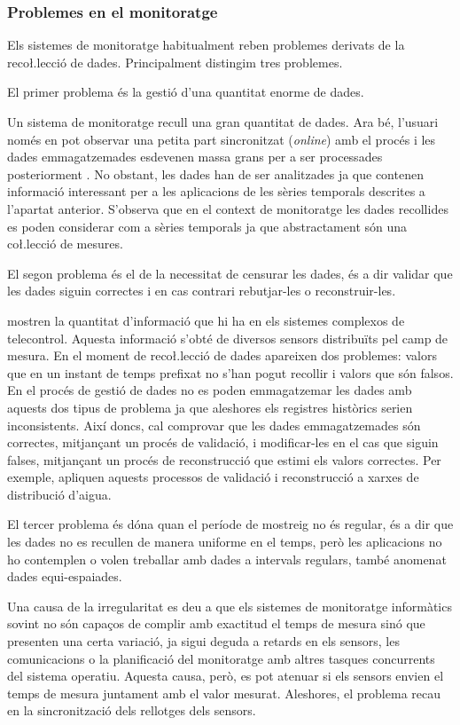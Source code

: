 \subsubsection{Problemes en el monitoratge}

Els sistemes de monitoratge habitualment reben problemes derivats de la reco\l.lecció de dades. Principalment distingim tres problemes.

El primer problema és la gestió d'una quantitat enorme de dades. 

Un sistema de monitoratge recull una gran quantitat de dades. Ara bé, l'usuari només en pot observar una petita part sincronitzat (\emph{online}) amb el procés i les dades emmagatzemades esdevenen massa grans per a ser processades posteriorment \parencite{keogh97}. No obstant, les dades han de ser analitzades ja que contenen informació interessant per a les aplicacions de les sèries temporals descrites a l'apartat anterior. S'observa que en el context de monitoratge les dades recollides es poden considerar com a sèries temporals ja que abstractament són una co\l.lecció de mesures.


El segon problema és el de la necessitat de censurar les dades, és a dir validar que les dades siguin correctes i en cas contrari rebutjar-les o reconstruir-les. 

\textcite{quevedo10} mostren la quantitat d'informació que hi ha en els sistemes complexos de telecontrol. Aquesta informació s'obté de diversos sensors distribuïts pel camp de mesura.
En el moment de reco\l.lecció de dades apareixen dos problemes: valors que en un instant de temps prefixat no s'han pogut recollir i valors que són falsos. En el procés de gestió de dades no es poden emmagatzemar les dades amb aquests dos tipus de problema ja que aleshores els registres històrics serien inconsistents. 
Així doncs, cal comprovar que les dades emmagatzemades són correctes, mitjançant un procés de validació, i modificar-les en el cas que siguin falses, mitjançant un procés de reconstrucció que estimi els valors correctes. Per exemple, \citeauthor{quevedo10} apliquen aquests processos de validació i reconstrucció a xarxes de distribució d'aigua.


El tercer problema és dóna quan el període de mostreig no és regular, és a dir que les dades no es recullen de manera uniforme en el temps, però les aplicacions no ho contemplen o volen treballar amb dades a intervals regulars, també anomenat dades equi-espaiades.

Una causa de la irregularitat es deu a que els sistemes de monitoratge informàtics sovint no són capaços de complir amb exactitud el temps de mesura sinó que presenten una certa variació, ja sigui deguda a retards en els sensors, les comunicacions o la planificació del monitoratge amb altres tasques concurrents del sistema operatiu. Aquesta causa, però, es pot atenuar si els sensors envien el temps de mesura juntament amb el valor mesurat. Aleshores, el problema recau en la sincronització dels rellotges dels sensors.

